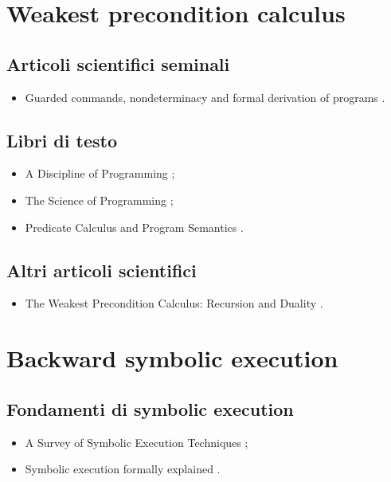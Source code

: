 \section*{Weakest precondition calculus}

\subsection*{Articoli scientifici seminali}
\begin{itemize}

\item Guarded commands, nondeterminacy and formal derivation of programs \cite{dijkstra1975wpc}.

\end{itemize}

\subsection*{Libri di testo}
\begin{itemize}

\item A Discipline of Programming \cite{dijkstra1976wpcbook};

\item The Science of Programming \cite{gries1987wpcbook};

\item Predicate Calculus and Program Semantics \cite{dijkstra1990wpcbook}.

\end{itemize}

\subsection*{Altri articoli scientifici}
\begin{itemize}

\item The Weakest Precondition Calculus: Recursion and Duality \cite{bonsangue1994wpc}.

\end{itemize}

\section*{Backward symbolic execution}

\subsection*{Fondamenti di symbolic execution}
\begin{itemize}

\item A Survey of Symbolic Execution Techniques \cite{baldoni2018symbexereview};

\item Symbolic execution formally explained \cite{boer2021symbexe}.

\end{itemize}


